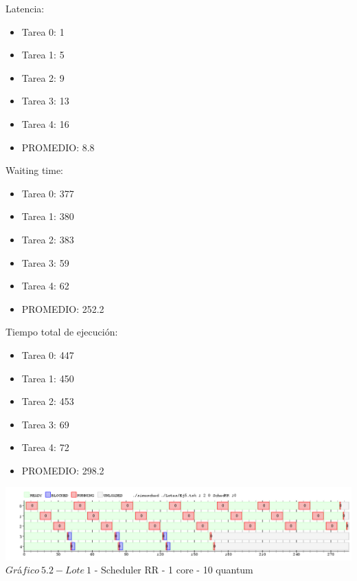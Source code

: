 \indent Latencia:\
\begin{itemize}
 \item Tarea 0: 1
 \item Tarea 1: 5
 \item Tarea 2: 9
 \item Tarea 3: 13
 \item Tarea 4: 16
 \item PROMEDIO: 8.8
\end{itemize}
\indent Waiting time:\
\begin{itemize}
 \item Tarea 0: 377
 \item Tarea 1: 380
 \item Tarea 2: 383
 \item Tarea 3: 59
 \item Tarea 4: 62
 \item PROMEDIO: 252.2
\end{itemize}
\indent Tiempo total de ejecuci\'{o}n:\
\begin{itemize}
 \item Tarea 0: 447
 \item Tarea 1: 450
 \item Tarea 2: 453
 \item Tarea 3: 69
 \item Tarea 4: 72
 \item PROMEDIO: 298.2
\end{itemize}

\begin{center}
  	\includegraphics[width=450pt]{ej5quantum10.png}
	  {$Gr$\'a$fico \ 5.2 - Lote \ 1$ - Scheduler RR - 1 core - 10 quantum}	
\end{center}

